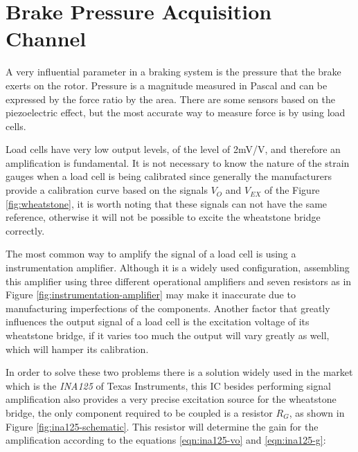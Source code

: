 \section{Brake Pressure Acquisition Channel}

	A very influential parameter in a braking system is the pressure that the brake exerts on the rotor. Pressure is a magnitude measured in Pascal and can be expressed by the force ratio by the area. There are some sensors based on the piezoelectric effect, but the most accurate way to measure force is by using load cells.

	Load cells have very low output levels, of the level of 2mV/V, and therefore an amplification is fundamental. It is not necessary to know the nature of the strain gauges when a load cell is being calibrated since generally the manufacturers provide a calibration curve based on the signals $V_{O}$ and $V_{EX}$ of the Figure \ref{fig:wheatstone}, it is worth noting that these signals can not have the same reference, otherwise it will not be possible to excite the wheatstone bridge correctly. 

	The most common way to amplify the signal of a load cell is using a instrumentation amplifier. Although it is a widely used configuration, assembling this amplifier using three different operational amplifiers and seven resistors as in Figure \ref{fig:instrumentation-amplifier} may make it inaccurate due to manufacturing imperfections of the components. Another factor that greatly influences the output signal of a load cell is the excitation voltage of its wheatstone bridge, if it varies too much the output will vary greatly as well, which will hamper its calibration.
		
	In order to solve these two problems there is a solution widely used in the market which is the \textit{INA125} of Texas Instruments, this IC besides performing signal amplification also provides a very precise excitation source for the wheatstone bridge, the only component required to be coupled is a resistor $R_{G}$, as shown in Figure \ref{fig:ina125-schematic}. This resistor will determine the gain for the amplification according to the equations \ref{eqn:ina125-vo} and \ref{eqn:ina125-g}:
	

